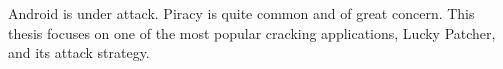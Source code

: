 Android is under attack.
Piracy is quite common and of great concern.
\newline
This thesis focuses on one of the most popular cracking applications, Lucky Patcher, and its attack strategy.
